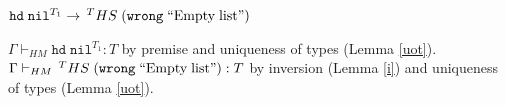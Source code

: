 \begin{case}
$\mathtt{hd}\;\mathtt{nil}^{T_{1}}\rightarrow\,^{T}HS\;(\mathtt{wrong}\;\mathrm{``Empty\;list"})$

$\Gamma\vdash_{HM}\mathtt{hd}\;\mathtt{nil}^{T_{1}}:T$ by premise and uniqueness of types (Lemma \ref{uot}).  $\Gamma\vdash_{HM}\,^{T}HS\;(\mathtt{wrong}\;\mathrm{``Empty\;list"}):T$ by inversion (Lemma \ref{i}) and uniqueness of types (Lemma \ref{uot}).
\end{case}